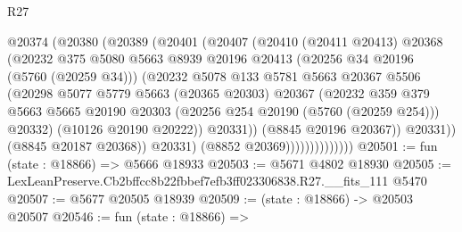 \begin{lexlean}{R27}
\begin{coremodule}
                            @20374
                              (@20380
                                (@20389
                                  (@20401
                                    (@20407
                                      (@20410
                                        (@20411 @20413)
                                        @20368
                                        (@20232
                                          @375
                                          @5080
                                          @5663
                                          @8939
                                          @20196
                                          @20413
                                          (@20256 @34 @20196 (@5760 (@20259 @34)))
                                          (@20232
                                            @5078
                                            @133
                                            @5781
                                            @5663
                                            @20367
                                            @5506
                                            (@20298
                                              @5077
                                              @5779
                                              @5663
                                              (@20365 @20303)
                                              @20367
                                              (@20232
                                                @359
                                                @379
                                                @5663
                                                @5665
                                                @20190
                                                @20303
                                                (@20256 @254 @20190 (@5760 (@20259 @254)))
                                                @20332)
                                              (@10126 @20190 @20222))
                                            @20331))
                                        (@8845 @20196 @20367))
                                      @20331))
                                  (@8845 @20187 @20368))
                                @20331)
                              (@8852 @20369))))))))))))))
@20501 := fun (state : @18866) => @5666 @18933
@20503 := @5671 @4802 @18930
@20505 := LexLeanPreserve.Cb2bffcc8b22fbbef7efb3ff023306838.R27.__fits_111 @5470
@20507 := @5677 @20505 @18939
@20509 := (state : @18866) -> @20503 @20507
@20546 := fun (state : @18866) =>

\end{coremodule}
\end{lexlean}
